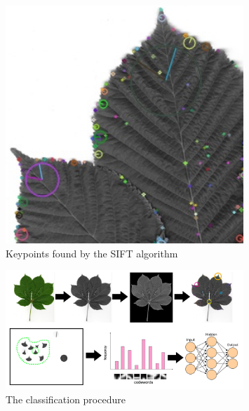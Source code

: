\documentclass{article}
\begin{document}
\begin{figure}[p]
    \centering
    \includegraphics[width=0.8\textwidth]{keypoints.png}
    \caption{Keypoints found by the SIFT algorithm}
    \label{fig:flowchart}
\end{figure}


\begin{figure}[p]
    \centering
    \includegraphics[width=0.8\textwidth]{flowchart.jpg}
    \caption{The classification procedure}
    \label{fig:flowchart}
\end{figure}
\end{document}
